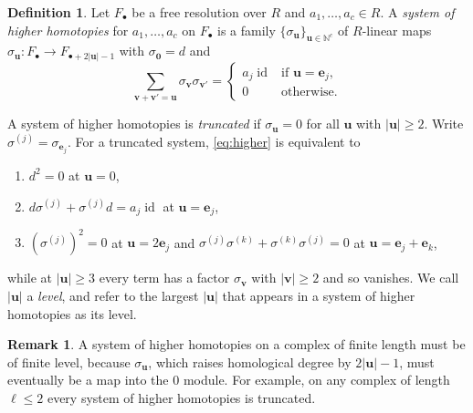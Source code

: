 \documentclass[12pt]{amsart}
\theoremstyle{plain}
\theoremstyle{definition}
\newtheorem{definition}[theorem]{Definition}
\newtheorem{remark}[theorem]{Remark}
\newcommand{\F}{ {F_\bullet} }
\newcommand{\id}{\operatorname{id}}
\newcommand{\N}{\mathbb{N}}
\begin{document}
\begin{definition}\label{def:higher}
    Let $\F$ be a free resolution over $R$ and $a_1, \dots, a_c \in R$. A \emph{system of higher homotopies} for $a_1, \dots, a_c$ on $\F$ is a family $\{\sigma_{\boldsymbol{u}}\}_{\boldsymbol{u} \in \N^c}$ of $R$-linear maps $\sigma_{\boldsymbol{u}} \colon F_\bullet \to F_{\bullet + 2|\boldsymbol{u}| - 1}$ with $\sigma_{\boldsymbol{0}} = d$ and
    \begin{equation}\label{eq:higher}
        \sum_{\boldsymbol{v} + \boldsymbol{v'} = \boldsymbol{u}} \sigma_{\boldsymbol{v}} \sigma_{\boldsymbol{v'}} =
        \begin{cases}
            a_j \id & \text{if } \boldsymbol{u} = \boldsymbol{e}_j,\\
            0 & \text{otherwise.}
        \end{cases}
    \end{equation}

    A system of higher homotopies is \emph{truncated} if $\sigma_{\boldsymbol{u}} = 0$ for all $\boldsymbol{u}$ with $|\boldsymbol{u}| \ge 2$. Write $\sigma^{(j)} = \sigma_{\boldsymbol{e}_j}$. For a truncated system, \eqref{eq:higher} is equivalent to
    \begin{enumerate}
        \item[(a)] $d^2 = 0$ at $\boldsymbol{u} = 0$,
        \item[(b)] $d\sigma^{(j)} + \sigma^{(j)} d = a_j \id$ at $\boldsymbol{u} = \boldsymbol{e}_j$,
        \item[(c)] $(\sigma^{(j)})^2 = 0$ at $\boldsymbol{u} = 2\boldsymbol{e}_j$ and $\sigma^{(j)}\sigma^{(k)} + \sigma^{(k)}\sigma^{(j)} = 0$ at $\boldsymbol{u} = \boldsymbol{e}_j + \boldsymbol{e}_k$,
    \end{enumerate}
    while at $|\boldsymbol{u}| \ge 3$ every term has a factor $\sigma_{\boldsymbol{v}}$ with $|\boldsymbol{v}| \ge 2$ and so vanishes.
    We call $| \boldsymbol{u} |$ a \emph{level}, and refer to the largest $| \boldsymbol{u}|$ that appears in a system of higher homotopies as its level.
\end{definition}

\begin{remark}\label{rem:length}
    A system of higher homotopies on a complex of finite length must be of finite level, because $\sigma_{\boldsymbol{u}}$, which raises homological degree by $2|\boldsymbol{u}| - 1$, must eventually be a map into the $0$ module. For example, on any complex of length $\ell \le 2$ every system of higher homotopies is truncated. 
\end{remark}
\end{document}
